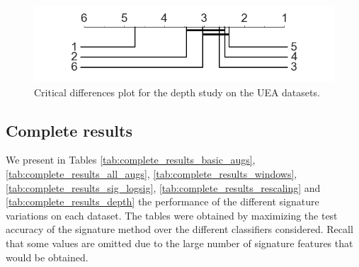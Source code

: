 \documentclass{article}
\theoremstyle{definition}
\theoremstyle{remark}
\begin{document}
	\begin{figure}[h]
  		\centering
  		\includegraphics[width=.6\linewidth]{images/depth.png}
  		\caption{Critical differences plot for the depth study on the UEA datasets.}
  		\label{fig:depth}
	\end{figure}

	\subsection{Complete results}

	We present in Tables \ref{tab:complete_results_basic_augs}, \ref{tab:complete_results_all_augs}, \ref{tab:complete_results_windows}, \ref{tab:complete_results_sig_logsig}, \ref{tab:complete_results_rescaling} and \ref{tab:complete_results_depth} the performance of the different signature variations on each dataset. The tables were obtained by maximizing the test accuracy of the signature method over the different classifiers considered. Recall that some values are omitted due to the large number of signature features that would be obtained.
\end{document}
